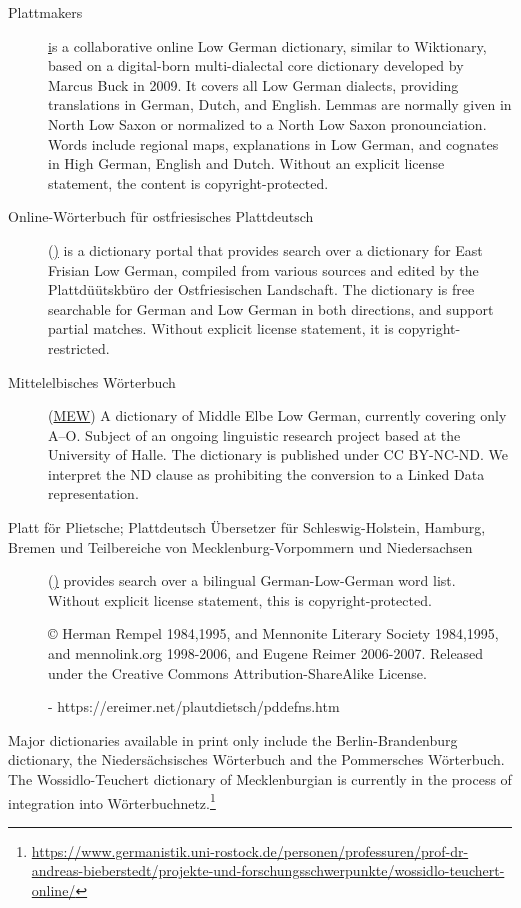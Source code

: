 \documentclass{article}
\begin{document}
\begin{description}
\item[Plattmakers] \href{https://plattmakers.de} is a collaborative online Low German dictionary, similar to Wiktionary, based on a digital-born multi-dialectal core dictionary developed by Marcus Buck in 2009. It covers all Low German dialects, providing translations in German, Dutch, and English. Lemmas are normally given in North Low Saxon or normalized to a North Low Saxon pronounciation. Words include regional maps, explanations in Low German, and cognates in High German, English and Dutch. Without an explicit license statement, the content is copyright-protected.

\item[Online-Wörterbuch für ostfriesisches Plattdeutsch] (\href{https://www.platt-wb.de/}) 
    is a dictionary portal that provides search over a dictionary for East Frisian Low German, compiled from various sources and edited by the Plattdüütskbüro der Ostfriesischen Landschaft. The dictionary is free searchable for German and Low German in both directions, and support partial matches. Without explicit license statement, it is copyright-restricted.

\item[Mittelelbisches Wörterbuch] (\href{https://mew.uzi.uni-halle.de/artikel/25748}{MEW})
    A dictionary of Middle Elbe Low German, currently covering only A–O. Subject of an ongoing linguistic research project based at the University of Halle.  The dictionary is published under CC BY-NC-ND. We interpret the ND clause as prohibiting the conversion to a Linked Data representation.

\item[Platt för Plietsche; Plattdeutsch Übersetzer für Schleswig-Holstein, Hamburg, Bremen und Teilbereiche von Mecklenburg-Vorpommern und Niedersachsen] (\href{https://www.plattdeutsches-woerterbuch.de/}) provides search over a bilingual German-Low-German word list. Without explicit license statement, this is copyright-protected.


© Herman Rempel 1984,1995, and Mennonite Literary Society 1984,1995, and mennolink.org 1998-2006, and Eugene Reimer 2006-2007.  Released under the Creative Commons Attribution-ShareAlike License.

- https://ereimer.net/plautdietsch/pddefns.htm

\end{description}

Major dictionaries available in print only include the Berlin-Brandenburg dictionary, the Niedersächsisches Wörterbuch and the Pommersches Wörterbuch. The Wossidlo-Teuchert dictionary of Mecklenburgian is currently in the process of integration into Wörterbuchnetz.\footnote{\url{https://www.germanistik.uni-rostock.de/personen/professuren/prof-dr-andreas-bieberstedt/projekte-und-forschungsschwerpunkte/wossidlo-teuchert-online/}}
\end{document}
